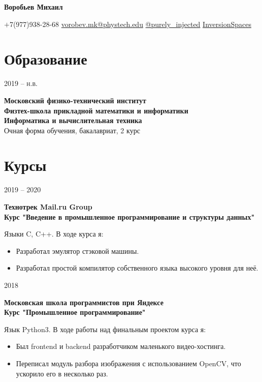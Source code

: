 \documentclass{article}
\makeatletter
\renewcommand{\maketitle}{
    \Huge
    \begin{center}
        \textbf{Воробьев Михаил}
    \end{center}

    \small
    \begin{center}
    \faMobile \hspace{0.1cm} $\boldsymbol{+}$7(977)938-28-68 
    \hfill
    \faEnvelope \hspace{0.1cm} \href{mailto:vorobev.mk@phystech.edu}{vorobev.mk@phystech.edu}
    \hfill
    \faPaperPlane \hspace{0.1cm} \href{https://t.me/purely_injected}{@purely\_injected}
    \hfill
    \faGithub \hspace{0.1cm} \href{https://github.com/InversionSpaces}{InversionSpaces}
    \end{center}
}
\newcommand{\entry}[3]{
    \begin{minipage}[t]{.11\linewidth}
        \hfill \textsc{#1}
    \end{minipage}
    \hfill\vline\hfill
    \begin{minipage}[t]{.80\linewidth}
        \textbf{#2} \\
        \footnotesize{#3}
    \end{minipage}
}
\makeatother
\begin{document}
    \maketitle
    \small
    
    \section{Образование}
        \entry {2019 -- н.в.}
        {Московский физико-технический институт\\
         Физтех-школа прикладной математики и информатики\\
         Информатика и вычислительная техника}
        {Очная форма обучения, бакалавриат, 2 курс}


    \section{Курсы}
        \entry {2019 -- 2020 \\
        }
        {Технотрек Mail.ru Group \\
        Курс "Введение в промышленное программирование и структуры данных"}
        {Языки C, C++. В ходе курса я:
        \begin{itemize}
            \item Разработал эмулятор стэковой машины.
            \item Разработал простой компилятор собственного языка высокого уровня для неё.
        \end{itemize} 
        }
          
        \vspace{.2cm}
        
        \entry {2018 \\
        }
        {Московская школа программистов при Яндексе \\
        Курс "Промышленное программирование"}
        {Язык Python3. В ходе работы над финальным проектом курса я:
        \begin{itemize}
            \item Был frontend и backend разработчиком маленького видео-хостинга.
            \item Переписал модуль разбора изображения с использованием OpenCV, что ускорило его в несколько раз.
        \end{itemize} 
        }  
        
\end{document}

